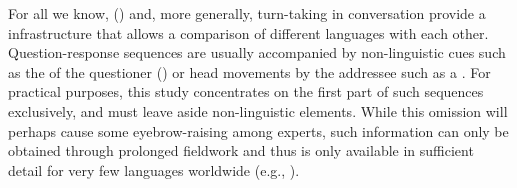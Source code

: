 For all we know,  (\citealt{EnfieldStiversLevinson2010}) and, more generally, turn-taking in conversation \citep{Stivers2009} provide a   infrastructure that allows a comparison of different languages with each other. Question-response sequences are usually accompanied by non-linguistic cues such as the  of the questioner (\citealt{RossanoBrownLevinson2009}) or head movements by the addressee such as a . For practical purposes, this study concentrates on the first part of such sequences exclusively, and must leave aside non-linguistic elements. While this omission will perhaps cause some eyebrow-raising among experts, such information can only be obtained through prolonged fieldwork and thus is only available in sufficient detail for very few languages worldwide (e.g., \citealt{Levinson2010}).

